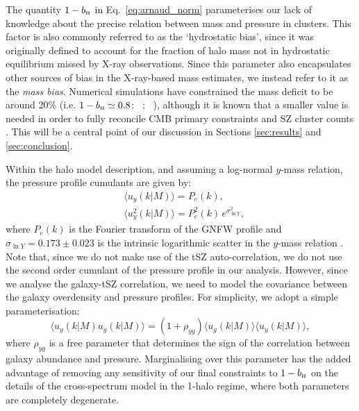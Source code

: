 \documentclass[useAMS,usenatbib]{mn2e}
\def\bH{b_{\scriptscriptstyle\rm H}}
\def\citejap#1{\citeauthor{#1}\ \citeyear{#1}}
\begin{document}
      The quantity $1-\bH$ in Eq.\!~\ref{eq:arnaud_norm} parameterises our lack of knowledge about the precise relation between mass and pressure in clusters. This factor is also commonly referred to as the `hydrostatic bias', since it was originally defined to account for the fraction of halo mass not in hydrostatic equilibrium missed by X-ray observations. Since this parameter also encapsulates other sources of bias in the X-ray-based mass estimates, we instead refer to it as the \emph{mass bias}. Numerical simulations have constrained the mass deficit to be around 20\% (i.e. $1-\bH\simeq0.8$: \citejap{2012ApJ...758...74B}; \citejap{2014ApJ...782..107N}), although it is known that a smaller value is needed in order to fully reconcile CMB primary constraints and SZ cluster counts \citep{2016A&A...594A..24P}. This will be a central point of our discussion in Sections \ref{sec:results} and \ref{sec:conclusion}.

      Within the halo model description, and assuming a log-normal $y$-mass relation, the pressure profile cumulants are given by:
      \begin{align}
        &\langle u_y(k|M)\rangle=P_e(k),\\
        &\langle u_y^2(k|M)\rangle=P_e^2(k)\,e^{\sigma_{\ln Y}^2},
      \end{align}
      where $P_e(k)$ is the Fourier transform of the GNFW profile and $\sigma_{\ln Y}=0.173\pm0.023$ is the intrinsic logarithmic scatter in the $y$-mass relation \cite{2016A&A...594A..24P}. Note that, since we do not make use of the tSZ auto-correlation, we do not use the second order cumulant of the pressure profile in our analysis. However, since we analyse the galaxy-tSZ correlation, we need to model the covariance between the galaxy overdensity and pressure profiles. For simplicity, we adopt a simple parameterisation:
      \begin{equation}
        \langle u_y(k|M) u_g(k|M)\rangle = (1+\rho_{yg})\langle u_g(k|M)\rangle \langle u_y(k|M)\rangle,
      \end{equation}
      where $\rho_{yg}$ is a free parameter that determines the sign of the correlation between galaxy abundance and pressure. Marginalising over this parameter has the added advantage of removing any sensitivity of our final constraints to $1-\bH$ on the details of the cross-spectrum model in the 1-halo regime, where both parameters are completely degenerate.
\end{document}
